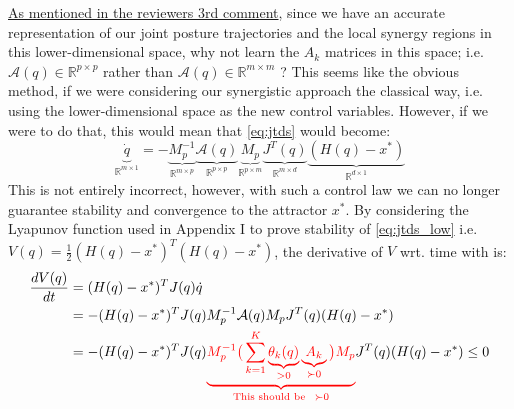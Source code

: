 \documentclass{article}
\begin{document}
\underline{As mentioned in the reviewers 3rd comment}, since we have an accurate representation of our joint posture trajectories and the local synergy regions in this lower-dimensional space, why not learn the $A_k$ matrices in this space; i.e. $\mathcal{A}(q)\in \mathbb{R}^{p\times p}$ rather than $\mathcal{A}(q)\in \mathbb{R}^{m\times m}$ ? This seems like the obvious method, if we were considering our synergistic approach the classical way, i.e. using the lower-dimensional space as the new control variables. However, if we were to do that, this would mean that \eqref{eq:jtds} would become:
\begin{equation}
\underbrace{\dot{q}}_{\mathbb{R}^{m\times 1}} = -\underbrace{M_p^{-1}}_{\mathbb{R}^{m\times p}}\underbrace{\mathcal{A}(q)}_{\mathbb{R}^{p\times p}}\underbrace{M_p}_{\mathbb{R}^{p\times m}}\underbrace{J^{T}(q)}_{\mathbb{R}^{m\times d}}\underbrace{(H(q)-x^*)}_{\mathbb{R}^{d\times 1}}
\label{eq:jtds_low}
\end{equation}
This is not entirely incorrect, however, with such a control law we can no longer guarantee stability and convergence to the attractor $x^{*}$. By considering the Lyapunov function used in Appendix I to prove stability of \eqref{eq:jtds_low} i.e. $V(q) = \frac{1}{2}(H(q) - x^*)^T(H(q) - x^*)$, the derivative of $ V $ wrt. time with is:
\begin{equation}
\begin{aligned}
\frac{dV(q)}{dt} &= (H(q) - x^*)^TJ(q)\dot{q}\\
&= -(H(q) - x^*)^TJ(q)M_p^{-1}\mathcal{A}(q)M_pJ^T(q)(H(q) - x^*)\\
&= -(H(q) - x^*)^TJ(q)\textcolor{red}{\underbrace{M_p^{-1}\big(\sum_{k=1}^{K}\underbrace{\theta_k(q)}_{> 0}\underbrace{A_k}_{\succ 0}\big)M_p}_{\text{This should be}~~ \succ 0}}J^T(q)(H(q) - x^*)\leq 0
\end{aligned}
\end{equation}
\end{document}
